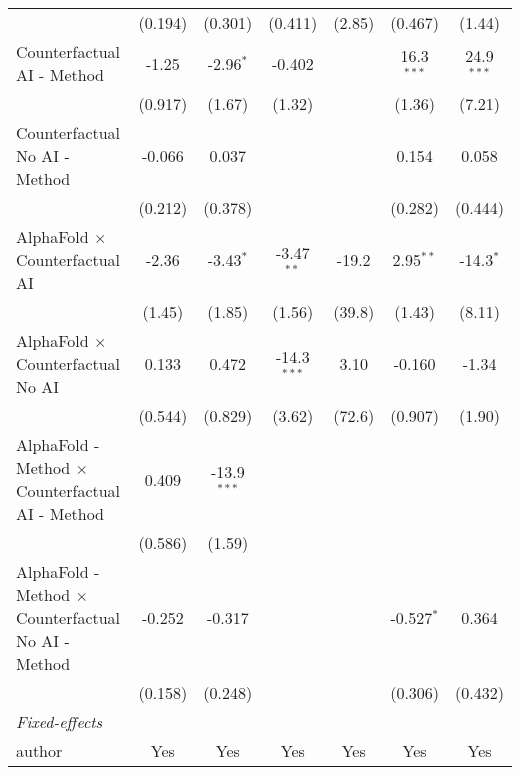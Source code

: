 \begin{tabular}{lcccccc}
                                                              & (0.194)      & (0.301)       & (0.411)       & (2.85)      & (0.467)      & (1.44)\\   
   Counterfactual AI - Method                                 & -1.25        & -2.96$^{*}$   & -0.402        &             & 16.3$^{***}$ & 24.9$^{***}$\\   
                                                              & (0.917)      & (1.67)        & (1.32)        &             & (1.36)       & (7.21)\\   
   Counterfactual No AI - Method                              & -0.066       & 0.037         &               &             & 0.154        & 0.058\\   
                                                              & (0.212)      & (0.378)       &               &             & (0.282)      & (0.444)\\   
   AlphaFold $\times$ Counterfactual AI                       & -2.36        & -3.43$^{*}$   & -3.47$^{**}$  & -19.2       & 2.95$^{**}$  & -14.3$^{*}$\\   
                                                              & (1.45)       & (1.85)        & (1.56)        & (39.8)      & (1.43)       & (8.11)\\   
   AlphaFold $\times$ Counterfactual No AI                    & 0.133        & 0.472         & -14.3$^{***}$ & 3.10        & -0.160       & -1.34\\   
                                                              & (0.544)      & (0.829)       & (3.62)        & (72.6)      & (0.907)      & (1.90)\\   
   AlphaFold - Method $\times$ Counterfactual AI - Method     & 0.409        & -13.9$^{***}$ &               &             &              &   \\   
                                                              & (0.586)      & (1.59)        &               &             &              &   \\   
   AlphaFold - Method $\times$ Counterfactual No AI - Method  & -0.252       & -0.317        &               &             & -0.527$^{*}$ & 0.364\\   
                                                              & (0.158)      & (0.248)       &               &             & (0.306)      & (0.432)\\   
   \midrule
   \emph{Fixed-effects}\\
   author                                                     & Yes          & Yes           & Yes           & Yes         & Yes          & Yes\\  

\end{tabular}
